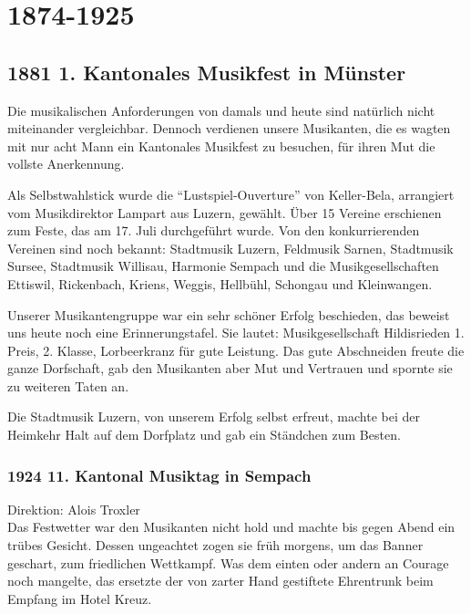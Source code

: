 \section*{1874-1925}

\begin{history}

    \subsection*{1881 1. Kantonales Musikfest in Münster}

    Die musikalischen Anforderungen von damals und heute sind natürlich nicht
    miteinander vergleichbar. Dennoch verdienen unsere Musikanten, die es wagten
    mit nur acht Mann ein Kantonales Musikfest zu besuchen, für ihren Mut die
    vollste Anerkennung.

    Als Selbstwahlstick wurde die \enquote{Lustspiel-Ouverture} von Keller-Bela,
    arrangiert vom Musikdirektor Lampart aus Luzern, gewählt. Über 15 Vereine
    erschienen zum Feste, das am 17. Juli durchgeführt wurde. Von den
    konkurrierenden Vereinen sind noch bekannt: Stadtmusik Luzern, Feldmusik
    Sarnen, Stadtmusik Sursee, Stadtmusik Willisau, Harmonie Sempach und die
    Musikgesellschaften Ettiswil, Rickenbach, Kriens, Weggis, Hellbühl, Schongau
    und Kleinwangen.

    Unserer Musikantengruppe war ein sehr schöner Erfolg beschieden, das beweist
    uns heute noch eine Erinnerungstafel. Sie lautet: Musikgesellschaft
    Hildisrieden 1. Preis, 2. Klasse, Lorbeerkranz für gute Leistung. Das gute
    Abschneiden freute die ganze Dorfschaft, gab den Musikanten aber Mut und
    Vertrauen und spornte sie zu weiteren Taten an.

    Die Stadtmusik Luzern, von unserem Erfolg selbst erfreut, machte bei der
    Heimkehr Halt auf dem Dorfplatz und gab ein Ständchen zum Besten.

    \subsubsection*{1924 11. Kantonal Musiktag in Sempach}

    Direktion: Alois Troxler\\
    Das Festwetter war den Musikanten nicht hold und machte bis gegen Abend ein
    trübes Gesicht. Dessen ungeachtet zogen sie früh morgens, um das Banner
    geschart, zum friedlichen Wettkampf. Was dem einten oder andern an Courage
    noch mangelte, das ersetzte der von zarter Hand gestiftete Ehrentrunk beim
    Empfang im Hotel Kreuz.


\end{history}
